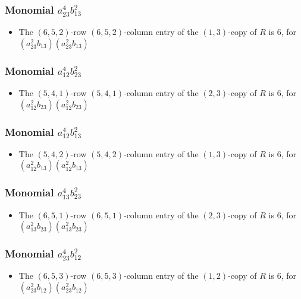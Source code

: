 \documentclass{article}
\begin{document}
\subsubsection{Monomial $ a_{23}^{4} b_{13}^{2} $}

\begin{itemize}
\item The $(6, 5, 2)$-row $(6, 5, 2)$-column entry of the $ \left(1, 3\right) $-copy of $R$ is $ 6 $, for $( a_{23}^{2} b_{13} )( a_{23}^{2} b_{13} )$ 
\end{itemize}
\subsubsection{Monomial $ a_{12}^{4} b_{23}^{2} $}

\begin{itemize}
\item The $(5, 4, 1)$-row $(5, 4, 1)$-column entry of the $ \left(2, 3\right) $-copy of $R$ is $ 6 $, for $( a_{12}^{2} b_{23} )( a_{12}^{2} b_{23} )$ 
\end{itemize}
\subsubsection{Monomial $ a_{12}^{4} b_{13}^{2} $}

\begin{itemize}
\item The $(5, 4, 2)$-row $(5, 4, 2)$-column entry of the $ \left(1, 3\right) $-copy of $R$ is $ 6 $, for $( a_{12}^{2} b_{13} )( a_{12}^{2} b_{13} )$ 
\end{itemize}
\subsubsection{Monomial $ a_{13}^{4} b_{23}^{2} $}

\begin{itemize}
\item The $(6, 5, 1)$-row $(6, 5, 1)$-column entry of the $ \left(2, 3\right) $-copy of $R$ is $ 6 $, for $( a_{13}^{2} b_{23} )( a_{13}^{2} b_{23} )$ 
\end{itemize}
\subsubsection{Monomial $ a_{23}^{4} b_{12}^{2} $}

\begin{itemize}
\item The $(6, 5, 3)$-row $(6, 5, 3)$-column entry of the $ \left(1, 2\right) $-copy of $R$ is $ 6 $, for $( a_{23}^{2} b_{12} )( a_{23}^{2} b_{12} )$ 
\end{itemize}
\end{document}

